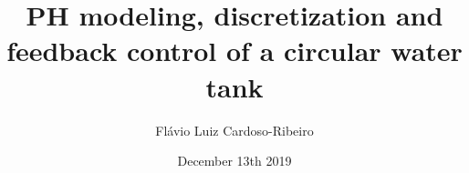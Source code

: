 \documentclass{beamer}
\begin{document}
\title[Port-Hamiltonian modeling, discretization and feedback control of a circular water tank]{PH modeling, discretization and feedback control of a circular water tank}
\author[Fl\'{a}vio Luiz Cardoso-Ribeiro]{Fl\'{a}vio Luiz Cardoso-Ribeiro}




\date{December 13th 2019}
\end{document}
